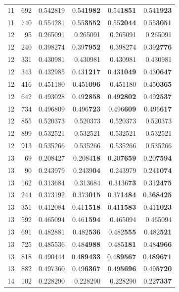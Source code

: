 \documentclass[10pt]{article}
\begin{document}
{\begin{longtable}{rrrrrr}
11 & 692 & 0.542819 & 0.54\textbf{1982} & 0.54\textbf{1851} & 0.54\textbf{1923} \\
11 & 740 & 0.554281 & 0.55\textbf{3552} & 0.55\textbf{2044} & 0.55\textbf{3051} \\
12 & 95 & 0.265091 & 0.265091 & 0.265091 & 0.265091 \\
12 & 240 & 0.398274 & 0.39\textbf{7952} & 0.398274 & 0.39\textbf{2776} \\
12 & 331 & 0.430981 & 0.430981 & 0.430981 & 0.430981 \\
12 & 343 & 0.432985 & 0.43\textbf{1217} & 0.43\textbf{1049} & 0.43\textbf{0647} \\
12 & 416 & 0.451180 & 0.451\textbf{096} & 0.451180 & 0.45\textbf{0365} \\
12 & 642 & 0.493028 & 0.49\textbf{2858} & 0.49\textbf{2802} & 0.49\textbf{2537} \\
12 & 734 & 0.496809 & 0.496\textbf{723} & 0.496\textbf{609} & 0.496\textbf{617} \\
12 & 855 & 0.520373 & 0.520373 & 0.520373 & 0.520373 \\
12 & 899 & 0.532521 & 0.532521 & 0.532521 & 0.532521 \\
12 & 913 & 0.535266 & 0.535266 & 0.535266 & 0.535266 \\
13 & 69 & 0.208427 & 0.2084\textbf{18} & 0.20\textbf{7659} & 0.20\textbf{7594} \\
13 & 90 & 0.243979 & 0.2439\textbf{04} & 0.243979 & 0.24\textbf{1074} \\
13 & 162 & 0.313684 & 0.313684 & 0.3136\textbf{73} & 0.31\textbf{2475} \\
13 & 244 & 0.373192 & 0.373\textbf{015} & 0.37\textbf{1484} & 0.3\textbf{68425} \\
13 & 351 & 0.412084 & 0.41\textbf{1518} & 0.41\textbf{1583} & 0.41\textbf{1023} \\
13 & 592 & 0.465094 & 0.46\textbf{1594} & 0.465094 & 0.465094 \\
13 & 691 & 0.482881 & 0.482\textbf{536} & 0.482\textbf{555} & 0.482\textbf{521} \\
13 & 725 & 0.485536 & 0.48\textbf{4988} & 0.485\textbf{181} & 0.48\textbf{4966} \\
13 & 818 & 0.490444 & 0.4\textbf{89433} & 0.4\textbf{89567} & 0.4\textbf{89671} \\
13 & 882 & 0.497360 & 0.49\textbf{6367} & 0.49\textbf{5696} & 0.49\textbf{5720} \\
14 & 102 & 0.228290 & 0.228290 & 0.228290 & 0.22\textbf{7337} \\

\end{longtable}}
\end{document}

